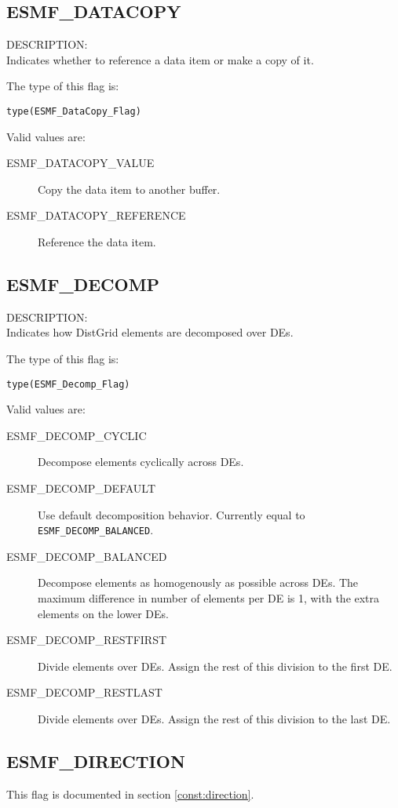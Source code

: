 \subsection{ESMF\_DATACOPY}
\label{const:datacopyflag}
{\sf DESCRIPTION:\\}
Indicates whether to reference a data item or make a copy of it.

The type of this flag is:

{\tt type(ESMF\_DataCopy\_Flag)}

Valid values are:
\begin{description}
\item [ESMF\_DATACOPY\_VALUE]
      Copy the data item to another buffer.
\item [ESMF\_DATACOPY\_REFERENCE]
      Reference the data item.
\end{description}

\subsection{ESMF\_DECOMP}
\label{const:decompflag}
{\sf DESCRIPTION:\\}
Indicates how DistGrid elements are decomposed over DEs.

The type of this flag is:

{\tt type(ESMF\_Decomp\_Flag)}

Valid values are:
\begin{description}
\item [ESMF\_DECOMP\_CYCLIC]
      Decompose elements cyclically across DEs.
\item [ESMF\_DECOMP\_DEFAULT]
      Use default decomposition behavior. Currently equal to 
      {\tt ESMF\_DECOMP\_BALANCED}.
\item [ESMF\_DECOMP\_BALANCED]
      Decompose elements as homogenously as possible across DEs. The maximum 
      difference in number of elements per DE is 1, with the extra elements on
      the lower DEs.
\item [ESMF\_DECOMP\_RESTFIRST]
      Divide elements over DEs. Assign the rest of this division to the first
      DE.
\item [ESMF\_DECOMP\_RESTLAST]
      Divide elements over DEs. Assign the rest of this division to the last DE.
\end{description}

\subsection{ESMF\_DIRECTION}
This flag is documented in section \ref{const:direction}.


